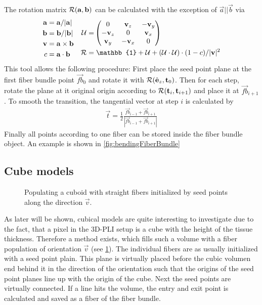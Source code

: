 The rotation matrix $\mathcal{R}(\mathbf{a}, \mathbf{b})$ can be calculated with the exception of $\vec{a} || \vec{b}$ via
\begin{align}
\begin{split}
    \vec{a} =& \; \vec{a} / |\vec{a}|\\
    \vec{b} =& \; \vec{b} / |\vec{b}|\\
    \vec{v} =& \; \vec{a} \times \vec{b}\\
    c =& \; \vec{a} \cdot \vec{b}
\end{split}
\quad
\begin{split}
    \mat{U} =& \begin{pmatrix} 0 & \vec{v}_z & -\vec{v}_y\\ -\vec{v}_z & 0 & \vec{v}_x\\ \vec{v}_y & -\vec{v}_x & 0\end{pmatrix}\\
    \mat{R} =& \; \mathbb{1} + \mat{U} + (\mat{U} \cdot \mat{U}) \cdot (1 - c) / |\vec{v}|^2
\end{split}
\end{align}
% 
This tool allows the following procedure:
First place the seed point plane at the first fiber bundle point $\vec{fb}_0$ and rotate it with $\mathcal{R}(\hat{\mathbf{e}}_z, \mathbf{t}_0)$.
Then for each step, rotate the plane at it original origin according to $\mathcal{R}(\mathbf{t}_i, \mathbf{t}_{i+1})$ and place it at $\vec{fb}_{i+1}$.
To smooth the transition, the tangential vector at step $i$ is calculated by
\begin{align}
    \vec{t} = \frac{1}{2} \frac{\vec{fb}_{i-1} + \vec{fb}_{i+1}}{|\vec{fb}_{i-1} + \vec{fb}_{i+1}|}
\end{align}
%
Finally all points according to one fiber can be stored inside the fiber bundle object.
An example is shown in \cref{fig:bendingFiberBundle}
%
%
%
\subsection{Cube models} \label{sec:cubeModelBuilding}
%
\begin{figure}[!t]
    \centering
    \setlength{\tikzwidth}{0.5\textwidth}
	\caption{Populating a cuboid with straight fibers initialized by seed points along the direction $\vec{v}$.}
    \label{fig:cubeBuild}%
\end{figure}
%
As later will be shown, cubical models are quite interesting to investigate due to the fact, that a pixel in the \ac{3D-PLI} setup is a cube with the height of the tissue thickness.
Therefore a method exists, which fills such a volume with a fiber population of orientation $\vec{v}$ (see \cref{fig:cubeBuild}).
The individual fibers are as usually initialized with a seed point plain.
This plane is virtually placed before the cubic volumen end behind it in the direction of the orientation such that the origins of the seed point planes line up with the origin of the cube.
Next the seed points are virtually connected.
If a line hits the volume, the entry and exit point is calculated and saved as a fiber of the fiber bundle.
%
%
%
